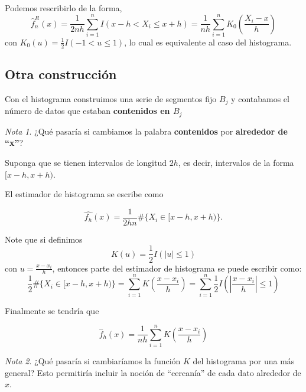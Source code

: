 \documentclass[
  12pt,
]{book}
\theoremstyle{definition}
\theoremstyle{definition}
\theoremstyle{definition}
\theoremstyle{definition}
\theoremstyle{remark}
\newtheorem*{remark}{Nota}
\begin{document}
Podemos rescribirlo de la forma,
\[
\hat{f}_{n}^{R}(x)=\frac{1}{2nh}\sum_{i=1}^{n}I(x-h<X_{i}\leq x+h)=\frac{1}{nh}\sum_{i=1}^{n}K_{0}\left(\frac{X_{i}-x}{h}\right)
\]
con \(K_{0}(u)=\frac{1}{2}I(-1<u\leq1)\), lo cual es equivalente al caso del histograma.

\hypertarget{otra-construcciuxf3n}{%
\subsection{Otra construcción}\label{otra-construcciuxf3n}}

Con el histograma construimos una serie de segmentos fijo \(B_{j}\) y contabamos el número de datos que estaban \textbf{contenidos en \(B_{j}\)}

\begin{remark}
¿Qué pasaría si cambiamos la palabra \textbf{contenidos} por \textbf{alrededor de ``x''}?
\end{remark}

Suponga que se tienen intervalos de longitud \(2h\), es decir, intervalos de la forma \([x-h,x+h)\).

El estimador de histograma se escribe como

\begin{equation*}
\hat{f_{h}}(x) = \dfrac{1}{2hn} \# \{ X_i \in [x-h,x+h) \}.
\end{equation*}

Note que si definimos
\begin{equation*}
K(u)=\frac{1}{2} I \left( \left\vert u \right\vert \leq 1 \right)
\end{equation*}
con \(u = \frac{x-x_i}{h}\), entonces parte del estimador de histograma se puede escribir como:
\begin{equation*}
\frac{1}{2}\# \{ X_i \in [x-h,x+h) \}
=\sum_{i=1}^{n} K\left( \frac{x-x_{i}}{h} \right)
=\sum_{i=1}^{n}  \frac{1}{2} I \left( \left\vert \frac{x-x_{i}}{h}
\right\vert \leq 1 \right)
\end{equation*}

Finalmente se tendría que

\begin{equation*}
\hat{f}_{h}\left( x \right) = \frac{1}{nh}\sum_{i=1}^{n} K\left( \frac{x-x_{i}}{h} \right)
\end{equation*}

\begin{remark}
¿Qué pasaría si cambiaríamos la función \(K\) del histograma por una más general? Esto permitiría incluir la noción de ``cercanía'' de cada dato alrededor de \(x\).
\end{remark}
\end{document}
